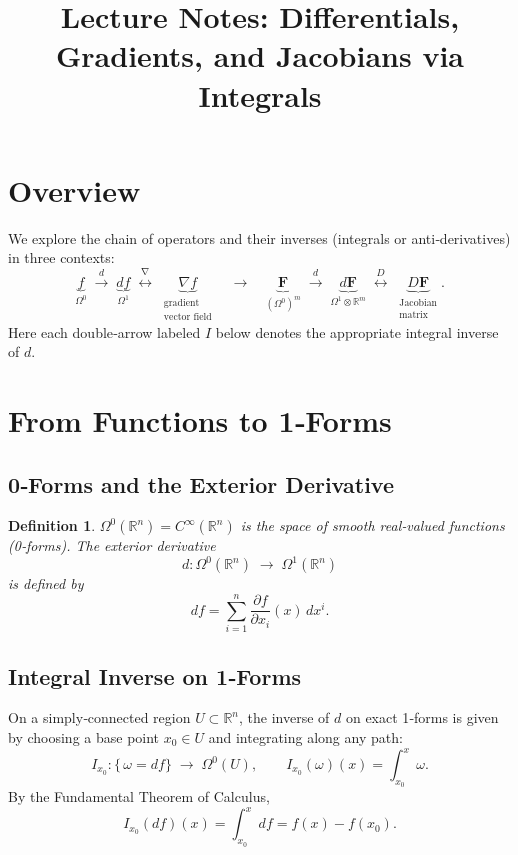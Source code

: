 \documentclass[12pt]{article}
\theoremstyle{definitionstyle}
\newtheorem{definition}{Definition} %
\newcommand{\R}{\mathbb{R}}
\begin{document}
\title{Lecture Notes: Differentials, Gradients, and Jacobians via Integrals}
\author{}
\date{}
\maketitle

\tableofcontents

\section*{Overview}

We explore the chain of operators and their inverses (integrals or anti‐derivatives) in three contexts:
\[
\underbrace{f}_{\Omega^0}
\;\xrightarrow{d}\;
\underbrace{df}_{\Omega^1}
\;\overset{\nabla}{\longleftrightarrow}\;
\underbrace{\nabla f}_{\substack{\text{gradient}\\\text{vector field}}}
\quad
\longrightarrow
\quad
\underbrace{\mathbf F}_{(\Omega^0)^m}
\;\xrightarrow{d}\;
\underbrace{d\mathbf F}_{\Omega^1\otimes\R^m}
\;\overset{D}{\longleftrightarrow}\;
\underbrace{D\mathbf F}_{\substack{\text{Jacobian}\\\text{matrix}}}.
\]
Here each double‐arrow labeled \(I\) below denotes the appropriate integral inverse of \(d\).

\bigskip

\section{From Functions to 1‐Forms}

\subsection{0‐Forms and the Exterior Derivative}

\begin{definition}
	\(\Omega^0(\R^n)=C^\infty(\R^n)\) is the space of smooth real‐valued functions (0‐forms).  The exterior derivative
	\[
	d:\Omega^0(\R^n)\;\longrightarrow\;\Omega^1(\R^n)
	\]
	is defined by
	\[
	d f
	=\sum_{i=1}^n \frac{\partial f}{\partial x_i}(x)\,dx^i.
	\]
\end{definition}

\subsection{Integral Inverse on 1‐Forms}

On a simply‐connected region \(U\subset\R^n\), the inverse of \(d\) on exact 1‐forms is given by choosing a base point \(x_0\in U\) and integrating along any path:
\[
I_{x_0}:\{\,\omega=df\}\;\longrightarrow\;\Omega^0(U),
\qquad
I_{x_0}(\omega)(x)
=\int_{x_0}^x \omega.
\]
By the Fundamental Theorem of Calculus,
\[
I_{x_0}(df)(x)
= \int_{x_0}^x df
= f(x) - f(x_0).
\]
\end{document}
